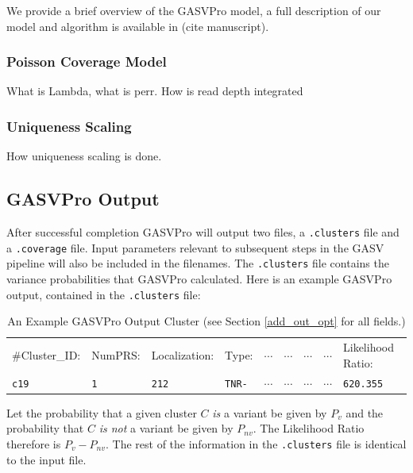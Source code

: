 \documentclass[11pt]{article}
\begin{document}
We provide a brief overview of the GASVPro model, a full description of our model and algorithm is available in (cite manuscript).

\subsubsection{Poisson Coverage Model}
What is Lambda, what is perr.
How is read depth integrated

\subsubsection{Uniqueness Scaling}
How uniqueness scaling is done. 


\subsection{GASVPro Output}
After successful completion GASVPro will output two files, a \verb+.clusters+ file and a \verb+.coverage+ file. Input parameters relevant to subsequent steps in the GASV pipeline will also be included in the filenames. The \verb+.clusters+ file contains the variance probabilities that GASVPro calculated. Here is an example GASVPro output, contained in the \verb+.clusters+ file:
\begin{table}[htbp]\small
   \centering
   \begin{tabular}{lllllllll} %
 \#Cluster\_ID:  &  NumPRS:   &  Localization: & Type:  &  $\cdots$    &     $\cdots$  & $\cdots$  &  $\cdots$ & Likelihood Ratio:\\
		\verb+c19+  &  \verb+1+  &    \verb+212+   &    \verb+TNR-+     & $\cdots$   &    $\cdots$  &     $\cdots$&    $\cdots$ & \verb+620.355+
    \end{tabular}
   \caption{An Example GASVPro Output Cluster (see Section \ref{add_out_opt} for all fields.)}
   \label{tab:booktabs}
\end{table}

\noindent Let the probability that a given cluster $C$ {\em is} a variant be given by $P_v$ and the probability that $C$ {\em is not} a variant be given by $P_{nv}$.  The Likelihood Ratio therefore is $P_v - P_{nv}$. The rest of the information in the \verb+.clusters+ file is identical to the input file. \label{LRexp}
\end{document}
